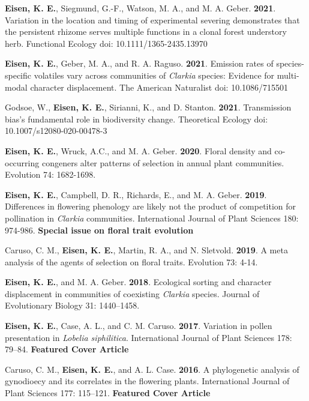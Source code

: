 \documentclass[letterpaper,11pt]{article}
\begin{document}
\begin{etaremune}
\item \textbf{Eisen, K. E.}, Siegmund, G.-F., Watson, M. A., and M. A. Geber. \textbf{2021}. Variation in the location and timing of experimental severing demonstrates that the persistent rhizome serves multiple functions in a clonal forest understory herb. Functional Ecology doi: 10.1111/1365-2435.13970\\
\item \textbf{Eisen, K. E.}, Geber, M. A., and R. A. Raguso. \textbf{2021}. Emission rates of species-specific volatiles vary across communities of \textit{Clarkia} species: Evidence for multi-modal character displacement. The American Naturalist doi: 10.1086/715501\\
\item Godsoe, W., \textbf{Eisen, K. E.}, Sirianni, K., and D. Stanton. \textbf{2021}. Transmission bias's fundamental role in biodiversity change. Theoretical Ecology doi: 10.1007/s12080-020-00478-3 \\
\item \textbf{Eisen, K. E.}, Wruck, A.C., and M. A. Geber. \textbf{2020}. Floral density and co-occurring congeners alter patterns of selection in annual plant communities. Evolution 74: 1682-1698. \\
\item \textbf{Eisen, K. E.}, Campbell, D. R., Richards, E., and M. A. Geber. \textbf{2019}. Differences in flowering phenology are likely not the product of competition for pollination in \textit{Clarkia} communities. International Journal of Plant Sciences 180: 974-986. \textbf{Special issue on floral trait evolution}\\
\item Caruso, C. M., \textbf{Eisen, K. E.}, Martin, R. A., and N. Sletvold. \textbf{2019}. A meta analysis of the agents of selection on floral traits. Evolution 73: 4-14.\\
\item \textbf{Eisen, K. E.}, and M. A. Geber. \textbf{2018}. Ecological sorting and character displacement in communities of coexisting \textit{Clarkia} species. Journal of Evolutionary Biology 31: 1440–1458.\\
\item \textbf{Eisen, K. E.}, Case, A. L., and C. M. Caruso. \textbf{2017}. Variation in pollen presentation in \textit{Lobelia siphilitica}. International Journal of Plant Sciences 178: 79–84. \textbf{Featured Cover Article}\\
\newpage
\vspace*{2mm}
\item Caruso, C. M., \textbf{Eisen, K. E.}, and A. L. Case. \textbf{2016}. A phylogenetic analysis of gynodioecy and its correlates in the flowering plants. International Journal of Plant Sciences 177: 115–121. \textbf{Featured Cover Article}\\


\end{etaremune}
\end{document}
